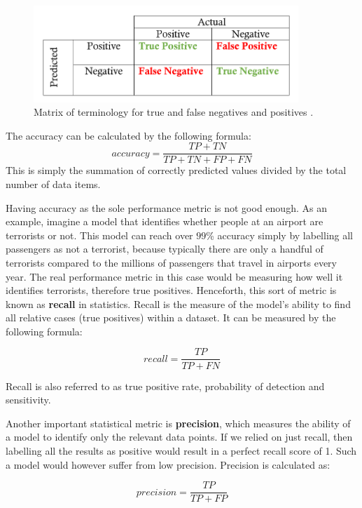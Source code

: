 \documentclass{UoYCSproject}
\begin{document}
\begin{figure}[h]
\includegraphics[width=10cm]{tptnfpfn.png}
\centering
\caption{Matrix of terminology for true and false negatives and positives \cite{precisionandrecall}.} 
\label{fig:tptnfpfn}
\end{figure}

The accuracy can be calculated by the following formula: 
\begin{equation}
\label{eq:accuracy}
accuracy=\frac{TP + TN}{TP + TN + FP + FN}
\end{equation}
This is simply the summation of correctly predicted values divided by the total number of data items.

Having accuracy as the sole performance metric is not good enough. As an example, imagine a model that identifies whether people at an airport are terrorists or not. This model can reach over $99$\% accuracy simply by labelling all passengers as not a terrorist, because typically there are only a handful of terrorists compared to the millions of passengers that travel in airports every year. The real performance metric in this case would be measuring how well it identifies terrorists, therefore true positives. Henceforth, this sort of metric is known as \textbf{recall} in statistics. Recall is the measure of the model's ability to find all relative cases (true positives) within a dataset. It can be measured by the following formula:

\begin{equation}
recall=\frac{TP}{TP + FN}
\end{equation}

Recall is also referred to as true positive rate, probability of detection and sensitivity.  

Another important statistical metric is \textbf{precision}, which measures the ability of a model to identify only the relevant data points. If we relied on just recall, then labelling all the results as positive would result in a perfect recall score of 1. Such a model would however suffer from low precision. Precision is calculated as:

\begin{equation}
precision=\frac{TP}{TP + FP}
\end{equation}
\end{document}
